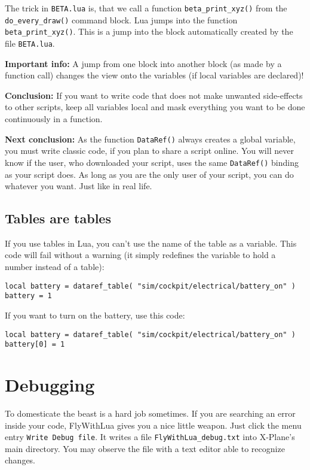 \documentclass[11pt,parskip=half,a4paper]{scrartcl}
\begin{document}
The trick in \verb|BETA.lua| is, that we call a function \verb|beta_print_xyz()| from the \verb|do_every_draw()| command block. Lua jumps into the function \verb|beta_print_xyz()|. This is a jump into the block automatically created by the file \verb|BETA.lua|.

\textbf{Important info:} A jump from one block into another block (as made by a function call) changes the view onto the variables (if local variables are declared)!

\textbf{Conclusion:} If you want to write code that does not make unwanted side-effects to other scripts, keep all variables local and mask everything you want to be done continuously in a function.

\textbf{Next conclusion:} As the function \verb|DataRef()| always creates a global variable, you must write classic code, if you plan to share a script online. You will never know if the user, who downloaded your script, uses the same \verb|DataRef()| binding as your script does. As long as you are the only user of your script, you can do whatever you want. Just like in real life.

\subsection{Tables are tables}

If you use tables in Lua, you can't use the name of the table as a variable. This code will fail without a warning (it simply redefines the variable to hold a number instead of a table):

\begin{lstlisting}
local battery = dataref_table( "sim/cockpit/electrical/battery_on" )
battery = 1
\end{lstlisting}

If you want to turn on the battery, use this code:

\begin{lstlisting}
local battery = dataref_table( "sim/cockpit/electrical/battery_on" )
battery[0] = 1
\end{lstlisting}


\newpage
\section{Debugging}

To domesticate the beast is a hard job sometimes. If you are searching an error inside your code, FlyWithLua gives you a nice little weapon. Just click the menu entry \verb|Write Debug file|. It writes a file \verb|FlyWithLua_debug.txt| into X-Plane's main directory. You may observe the file with a text editor able to recognize changes.
\end{document}
